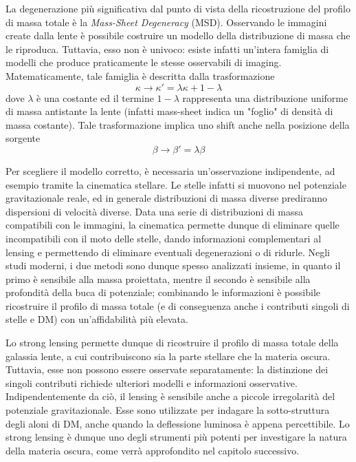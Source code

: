 La degenerazione più significativa dal punto di vista della ricostruzione del profilo di massa totale è la \emph{Mass-Sheet Degeneracy} (MSD). 
Osservando le immagini create dalla lente è possibile costruire un modello della distribuzione di massa che le riproduca. Tuttavia, esso non è univoco: esiste infatti un'intera famiglia di modelli che produce praticamente le stesse osservabili di imaging. 
Matematicamente, tale famiglia è descritta dalla trasformazione
\begin{equation}
    \kappa \to \kappa'=\lambda \kappa + 1 - \lambda
\end{equation}
dove $\lambda $ è una costante ed il termine $1-\lambda$ rappresenta una distribuzione uniforme di massa antistante la lente (infatti mass-sheet indica un "foglio" di densità di massa costante). Tale trasformazione implica uno shift anche nella posizione della sorgente 
\begin{equation}
    \beta \to \beta'=\lambda \beta
\end{equation}

Per scegliere il modello corretto, è necessaria un'osservazione indipendente, ad esempio tramite la cinematica stellare. 
Le stelle infatti si muovono nel potenziale gravitazionale reale, ed in generale distribuzioni di massa diverse prediranno dispersioni di velocità diverse. Data una serie di distribuzioni di massa compatibili con le immagini, la cinematica permette dunque di eliminare quelle incompatibili con il moto delle stelle, dando informazioni complementari al lensing e permettendo di eliminare eventuali degenerazioni o di ridurle. Negli studi moderni, i due metodi sono dunque spesso analizzati insieme, in quanto il primo è sensibile alla massa proiettata, mentre il secondo è sensibile alla profondità della buca di potenziale; combinando le informazioni è possibile ricostruire il profilo di massa totale (e di conseguenza anche i contributi singoli di stelle e DM) con un'affidabilità più elevata.

Lo strong lensing permette dunque di ricostruire il profilo di massa totale della galassia lente, a cui contribuiscono sia la parte stellare che la materia oscura. Tuttavia, esse non possono essere osservate separatamente: la distinzione dei singoli contributi richiede ulteriori modelli e informazioni osservative. Indipendentemente da ciò, il lensing è sensibile anche a piccole irregolarità del potenziale gravitazionale. Esse sono utilizzate per indagare la sotto-struttura degli aloni di DM, anche quando la deflessione luminosa è appena percettibile.
Lo strong lensing è dunque uno degli strumenti più potenti per investigare la natura della materia oscura, come verrà approfondito nel capitolo successivo.